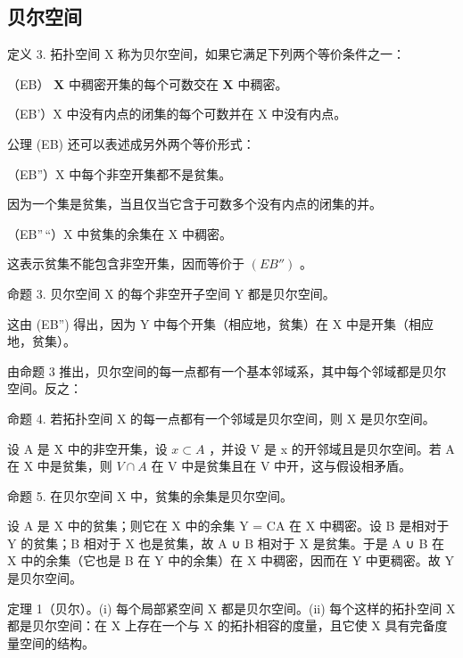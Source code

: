 \subsection{贝尔空间}

定义 3. 拓扑空间 X 称为贝尔空间，如果它满足下列两个等价条件之一：

（EB） \(\mathbf{X}\) 中稠密开集的每个可数交在 \(\mathbf{X}\) 中稠密。

（EB'）X 中没有内点的闭集的每个可数并在 X 中没有内点。

公理 (EB) 还可以表述成另外两个等价形式：

（EB''）X 中每个非空开集都不是贫集。

因为一个集是贫集，当且仅当它含于可数多个没有内点的闭集的并。

（EB''\,``）X 中贫集的余集在 X 中稠密。

这表示贫集不能包含非空开集，因而等价于 \((EB'')\) 。

命题 3. 贝尔空间 X 的每个非空开子空间 Y 都是贝尔空间。

这由 (EB'') 得出，因为 Y 中每个开集（相应地，贫集）在 X 中是开集（相应地，贫集）。

由命题 3 推出，贝尔空间的每一点都有一个基本邻域系，其中每个邻域都是贝尔空间。反之：

命题 4. 若拓扑空间 X 的每一点都有一个邻域是贝尔空间，则 X 是贝尔空间。

设 A 是 X 中的非空开集，设 \(x \subset A\) ，并设 V 是 x 的开邻域且是贝尔空间。若 A 在 X 中是贫集，则 \(V \cap A\) 在 V 中是贫集且在 V 中开，这与假设相矛盾。

命题 5. 在贝尔空间 X 中，贫集的余集是贝尔空间。

设 A 是 X 中的贫集；则它在 X 中的余集 Y = CA 在 X 中稠密。设 B 是相对于 Y 的贫集；B 相对于 X 也是贫集，故 A ∪ B 相对于 X 是贫集。于是 A ∪ B 在 X 中的余集（它也是 B 在 Y 中的余集）在 X 中稠密，因而在 Y 中更稠密。故 Y 是贝尔空间。

定理 1（贝尔）。(i) 每个局部紧空间 X 都是贝尔空间。(ii) 每个这样的拓扑空间 X 都是贝尔空间：在 X 上存在一个与 X 的拓扑相容的度量，且它使 X 具有完备度量空间的结构。

